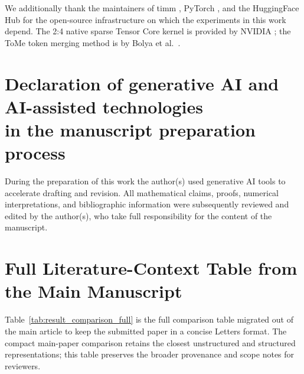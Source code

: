 \documentclass[11pt]{article}
\theoremstyle{plain}
\theoremstyle{definition}
\theoremstyle{remark}
\newcommand{\1}{\mathbf{1}}
\begin{document}
We additionally thank the maintainers of timm \citep{rw2019timm}, PyTorch \citep{pytorch2019}, and the HuggingFace Hub for the open-source infrastructure on which the experiments in this work depend. The 2:4 native sparse Tensor Core kernel is provided by NVIDIA \citep{mishra2021accelerating}; the ToMe token merging method is by Bolya et al.\ \citep{bolya2023tome}.

\section*{Declaration of generative AI and AI-assisted technologies\\ in the manuscript preparation process}
During the preparation of this work the author(s) used generative AI tools to accelerate drafting and revision. All mathematical claims, proofs, numerical interpretations, and bibliographic information were subsequently reviewed and edited by the author(s), who take full responsibility for the content of the manuscript.


\FloatBarrier
\section{Full Literature-Context Table from the Main Manuscript}
\label{sec:full_literature_context_table}

Table~\ref{tab:result_comparison_full} is the full comparison table migrated out of the main article to keep the submitted paper in a concise Letters format. The compact main-paper comparison retains the closest unstructured and structured representations; this table preserves the broader provenance and scope notes for reviewers.
\end{document}
